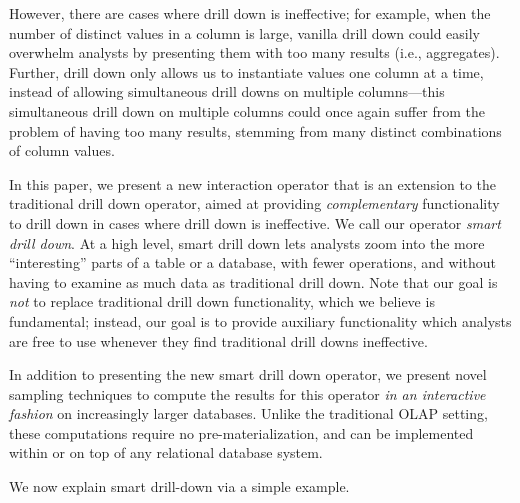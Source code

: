 \documentclass[10pt,journal,compsoc]{IEEEtran}
\newcounter{prob}
\begin{document}
However, there are cases where drill down is ineffective; 
for example, when the number of distinct values
in a column is large, vanilla drill down 
could easily overwhelm analysts by presenting them with too many 
results (i.e., aggregates). 
Further, drill down only allows us to instantiate values
 one column at a time, instead of allowing simultaneous drill downs
on multiple columns---this simultaneous drill down on multiple columns 
could once again suffer from the problem
of having too many results, stemming from many distinct combinations of column values.

In this paper, we present a new interaction operator 
that is an extension to the traditional 
drill down operator, aimed at providing {\em complementary}
functionality to drill down in cases where drill down is
ineffective. We call our operator {\em smart drill down}.
At a high level, smart drill down lets analysts zoom into
the more ``interesting'' parts of a table or a database,
with fewer operations, and without having to examine as much
data as traditional drill down.
Note that our goal is {\em not} to replace traditional 
drill down functionality, which we believe is fundamental;
instead, our goal is to provide auxiliary functionality 
which analysts are free to use whenever they find 
traditional drill downs ineffective.

In addition to presenting the new smart drill down operator, we present novel sampling techniques to compute the results for this
operator {\em in an interactive fashion} on increasingly larger databases. 
Unlike the traditional OLAP setting, these computations 
require no pre-materialization, and can be implemented 
within or on top of any relational database system.



We now explain smart drill-down via a simple example.
\end{document}
